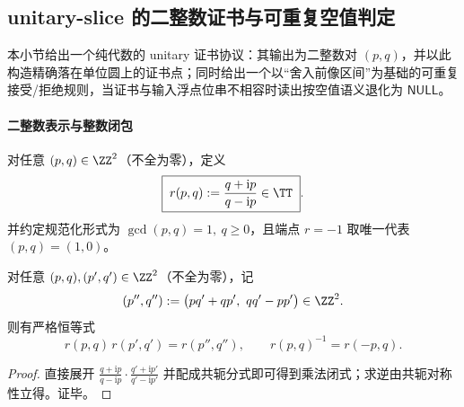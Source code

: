 \subsection{unitary-slice 的二整数证书与可重复空值判定}\label{subsec:unitary-two-integer-certificate}
本小节给出一个纯代数的 unitary 证书协议：其输出为二整数对 \((p,q)\)，并以此构造精确落在单位圆上的证书点；同时给出一个以“舍入前像区间”为基础的可重复接受/拒绝规则，当证书与输入浮点位串不相容时读出按空值语义退化为 \(\mathsf{NULL}\)。

\paragraph{二整数表示与整数闭包}
\begin{definition}\label{def:unitary-two-integer-certificate}
对任意 \((p,q)\in\ZZ^{2}\)（不全为零），定义
\begin{equation}\label{eq:unitary-two-integer-map}
\boxed{\;
r(p,q):=\frac{q+\mathrm{i}p}{q-\mathrm{i}p}\in\TT\; }.
\end{equation}
并约定规范化形式为
\(
\gcd(p,q)=1,\ q\ge 0
\)，且端点 \(r=-1\) 取唯一代表 \((p,q)=(1,0)\)。
\end{definition}

\begin{proposition}[单位圆乘法在二整数表示下闭合]\label{prop:unitary-two-integer-closure}
对任意 \((p,q),(p',q')\in\ZZ^{2}\)（不全为零），记
\[
(p'',q''):=\bigl(pq'+qp',\ qq'-pp'\bigr)\in\ZZ^{2}.
\]
则有严格恒等式
\[
r(p,q)\,r(p',q')=r(p'',q''),
\qquad
r(p,q)^{-1}=r(-p,q).
\]
\end{proposition}
\begin{proof}
直接展开
\(
\frac{q+\mathrm{i}p}{q-\mathrm{i}p}\cdot\frac{q'+\mathrm{i}p'}{q'-\mathrm{i}p'}
\)
并配成共轭分式即可得到乘法闭式；求逆由共轭对称性立得。证毕。
\end{proof}

